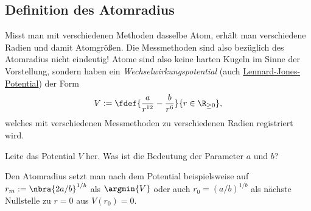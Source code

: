 \documentclass{subfiles}
\begin{document}
    
        \subsection{Definition des Atomradius}\label{Ub:DefAtomRadius}\marginnote{$\to$ \hyperref[Ub:AtomEigenschaften]{\faBook}}
            Misst man mit verschiedenen Methoden dasselbe Atom, erhält man verschiedene Radien und damit Atomgrößen. Die Messmethoden sind also bezüglich des Atomradius nicht eindeutig! Atome sind also keine harten Kugeln im Sinne der Vorstellung, sondern haben ein \emph{Wechselwirkungspotential} (auch \href{https://de.wikipedia.org/wiki/Lennard-Jones-Potential}{Lennard-Jones-Potential}) der Form 
            \[V:=\fdef{\frac{a}{r^{12}}-\frac{b}{r^6}}{r\in\R_{\geq 0}},\]
            welches mit verschiedenen Messmethoden zu verschiedenen Radien registriert wird. 
            \begin{Aufgabe}
                \nr{} Leite das Potential $V$ her. Was ist die Bedeutung der Parameter $a$ und $b$?
            \end{Aufgabe}
            Den Atomradius setzt man nach dem Potential beispielsweise auf $r_m:=\nbra{2a/b}^{1/b}$ als $\argmin{V}$ oder auch $r_0=(a/b)^{1/b}$ als nächste Nullstelle zu $r=0$ aus $V(r_0)=0$. 
            
\end{document}
